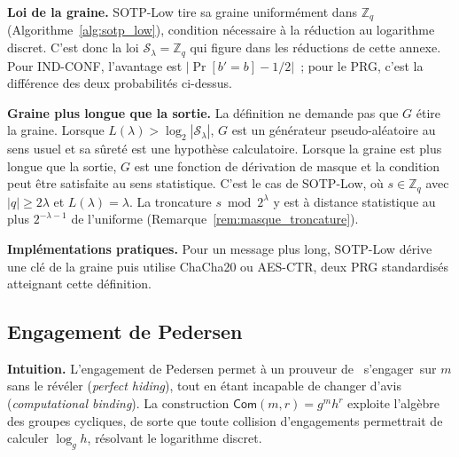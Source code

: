 \begin{sloppypar}
\noindent\textbf{Loi de la graine.} SOTP-Low tire sa graine uniform\'ement dans
$\mathbb{Z}_q$ (Algorithme~\ref{alg:sotp_low}), condition n\'ecessaire \`a la r\'eduction
au logarithme discret. C'est donc la loi $\mathcal{S}_\lambda = \mathbb{Z}_q$ qui
figure dans les r\'eductions de cette annexe. Pour IND-CONF, l'avantage est
$|\Pr[b' = b] - 1/2|$~; pour le PRG, c'est la diff\'erence des deux probabilit\'es
ci-dessus.

\noindent\textbf{Graine plus longue que la sortie.} La d\'efinition ne demande pas que $G$ \'etire
la graine. Lorsque $L(\lambda) > \log_2|\mathcal{S}_\lambda|$, $G$ est un g\'en\'erateur pseudo-al\'eatoire
au sens usuel et sa s\^uret\'e est une hypoth\`ese calculatoire. Lorsque la graine est plus longue que
la sortie, $G$ est une fonction de d\'erivation de masque et la condition peut \^etre satisfaite au
sens statistique. C'est le cas de SOTP-Low, o\`u $s \in \mathbb{Z}_q$ avec $|q| \geq 2\lambda$ et
$L(\lambda) = \lambda$. La troncature $s \bmod 2^\lambda$ y est \`a distance statistique au plus
$2^{-\lambda-1}$ de l'uniforme (Remarque~\ref{rem:masque_troncature}).

\noindent\textbf{Impl\'ementations pratiques.} Pour un message plus long, SOTP-Low d\'erive une cl\'e
de la graine puis utilise ChaCha20 ou AES-CTR, deux PRG standardis\'es atteignant cette d\'efinition.

\subsection{Engagement de Pedersen}

\noindent\textbf{Intuition.} L'engagement de Pedersen permet \`a un
prouveur de \guillemotleft~s'engager~\guillemotright sur $m$ sans le r\'ev\'eler (\emph{perfect hiding}),
tout en \'etant incapable de changer d'avis (\emph{computational binding}).
La construction $\mathsf{Com}(m, r) = g^m h^r$ exploite l'alg\`ebre des
groupes cycliques, de sorte que toute collision d'engagements permettrait de calculer
$\log_g h$, r\'esolvant le logarithme discret.


\end{sloppypar}
